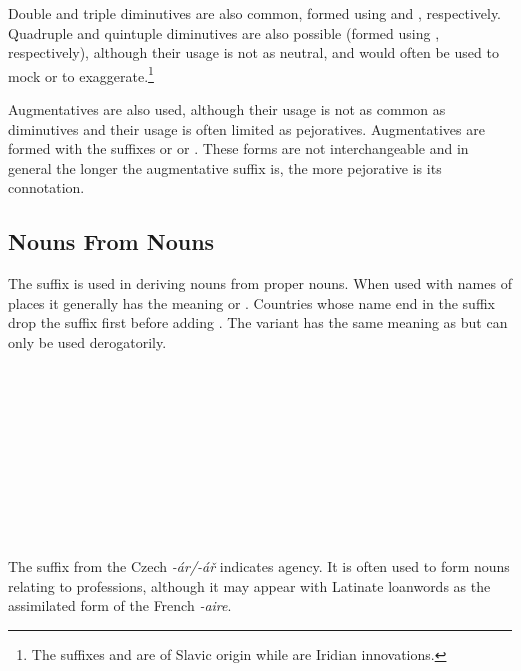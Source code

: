 Double and triple diminutives are also common, formed using  and , respectively. Quadruple and quintuple diminutives are also possible (formed using  , respectively), although their usage is not as neutral, and would often be used to mock or to exaggerate.\footnote{The suffixes  and  are of Slavic origin while   are Iridian innovations.}

Augmentatives are also used, although their usage is not as common as diminutives and their usage is often limited as pejoratives. Augmentatives are formed with the suffixes  or  or . These forms are not interchangeable and in general the longer the augmentative suffix is, the more pejorative is its connotation.

\subsection{Nouns From Nouns}

The suffix  is used in deriving nouns from proper nouns. When used with names of places it generally has the meaning  or . Countries whose name end in the suffix  drop the suffix first before adding . The variant  has the same meaning as  but can only be used derogatorily.

\begin{multicols}{2}
  \ex
  \\
  \\
  \\
  \\
  \\
  \\
  \\
  \\
  \\
  \xe
\end{multicols}


The suffix  from the Czech \emph{-ár/-á\v{r}} indicates agency. It is often used to form nouns relating to professions, although it may appear with Latinate loanwords as the assimilated form of the French \emph{-aire}.

